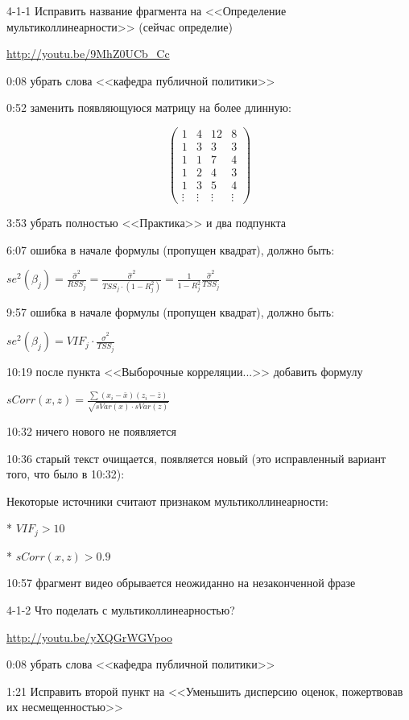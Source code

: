 \documentclass[12pt,a4paper]{article}
\begin{document}
4-1-1 Исправить название фрагмента  на <<Определение мультиколлинеарности>> (сейчас определие)

\url{http://youtu.be/9MhZ0UCb_Cc}

0:08 убрать слова <<кафедра публичной политики>>  

0:52 заменить появляющуюся матрицу на более длинную:

\[
\begin{pmatrix}
1 & 4 & 12 & 8 \\
1 & 3 & 3   & 3 \\
1 & 1 & 7   & 4 \\
1 & 2 & 4   & 3 \\
1 & 3 & 5   & 4 \\ 
\vdots & \vdots & \vdots & \vdots
\end{pmatrix}
\]

3:53 убрать полностью <<Практика>> и два подпункта

6:07 ошибка в начале формулы (пропущен квадрат), должно быть:

$se^2(\hat{\beta}_j)=\frac{\hat{\sigma}^2}{RSS_j}=\frac{\hat{\sigma}^2}{TSS_j\cdot (1-R^2_j)}=
\frac{1}{1-R^2_j}\frac{\hat{\sigma}^2}{TSS_j}$

9:57 ошибка в начале формулы (пропущен квадрат), должно быть:

$se^2(\hat{\beta}_j)=VIF_j \cdot \frac{\hat{\sigma}^2}{TSS_j}$

10:19 после пункта <<Выборочные корреляции...>> добавить формулу

$sCorr(x,z)=\frac{\sum (x_i - \bar{x}) (z_i - \bar{z}) }{\sqrt{sVar(x) \cdot sVar(z)}}$

10:32 ничего нового не появляется

10:36 старый текст очищается, появляется новый (это исправленный вариант того, что было в 10:32):

Некоторые источники считают признаком мультиколлинеарности:

* $VIF_j > 10$

* $sCorr(x,z)>0.9$

10:57 фрагмент видео обрывается неожиданно на незаконченной фразе

4-1-2 Что поделать с мультиколлинеарностью?

\url{http://youtu.be/yXQGrWGVpoo}

0:08 убрать слова <<кафедра публичной политики>>  

1:21 Исправить второй пункт на <<Уменьшить дисперсию оценок, пожертвовав их несмещенностью>>
\end{document}
